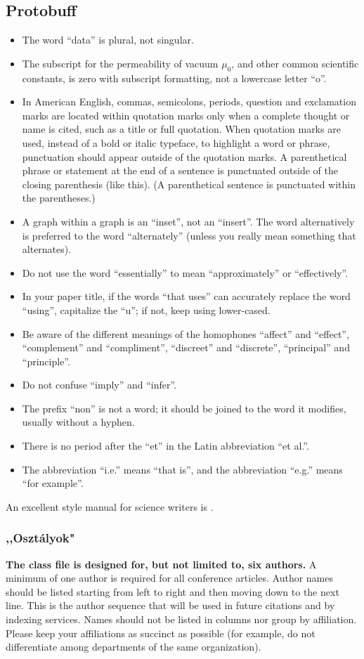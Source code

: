 \documentclass[conference]{IEEEtran}
\begin{document}
\subsection{Protobuff}\label{SCM}
\begin{itemize}
\item The word ``data'' is plural, not singular.
\item The subscript for the permeability of vacuum $\mu_{0}$, and other common scientific constants, is zero with subscript formatting, not a lowercase letter ``o''.
\item In American English, commas, semicolons, periods, question and exclamation marks are located within quotation marks only when a complete thought or name is cited, such as a title or full quotation. When quotation marks are used, instead of a bold or italic typeface, to highlight a word or phrase, punctuation should appear outside of the quotation marks. A parenthetical phrase or statement at the end of a sentence is punctuated outside of the closing parenthesis (like this). (A parenthetical sentence is punctuated within the parentheses.)
\item A graph within a graph is an ``inset'', not an ``insert''. The word alternatively is preferred to the word ``alternately'' (unless you really mean something that alternates).
\item Do not use the word ``essentially'' to mean ``approximately'' or ``effectively''.
\item In your paper title, if the words ``that uses'' can accurately replace the word ``using'', capitalize the ``u''; if not, keep using lower-cased.
\item Be aware of the different meanings of the homophones ``affect'' and ``effect'', ``complement'' and ``compliment'', ``discreet'' and ``discrete'', ``principal'' and ``principle''.
\item Do not confuse ``imply'' and ``infer''.
\item The prefix ``non'' is not a word; it should be joined to the word it modifies, usually without a hyphen.
\item There is no period after the ``et'' in the Latin abbreviation ``et al.''.
\item The abbreviation ``i.e.'' means ``that is'', and the abbreviation ``e.g.'' means ``for example''.
\end{itemize}
An excellent style manual for science writers is \cite{b7}.

\subsubsection{,,Osztályok"}
\textbf{The class file is designed for, but not limited to, six authors.} A 
minimum of one author is required for all conference articles. Author names 
should be listed starting from left to right and then moving down to the 
next line. This is the author sequence that will be used in future citations 
and by indexing services. Names should not be listed in columns nor group by 
affiliation. Please keep your affiliations as succinct as possible (for 
example, do not differentiate among departments of the same organization).
\end{document}
